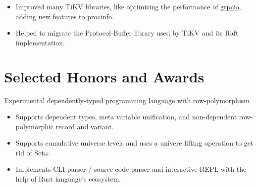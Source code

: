 \documentclass{resume}
\begin{document}
\begin{itemize}
  \item Improved many TiKV libraries, like
    optimizing the performance of
    \href{https://docs.rs/crate/grpcio} {grpcio},
    adding new features to
    \href{https://docs.rs/crate/procinfo} {procinfo}.
  \item Helped to migrate the Protocol-Buffer library used by TiKV and its Raft implementation.
\end{itemize}

\section{Selected Honors and Awards}


Experimental dependently-typed programming language with row-polymorphism
\begin{itemize}
  \item Supports dependent types, meta variable unification, and non-dependent row-polymorphic record and variant.
  \item Supports cumulative universe levels and uses a univere lifting operation to get rid of Set$\omega$.
  \item Implements CLI parser / source code parser and interactive REPL with the help of Rust language's ecosystem.
\end{itemize}
\end{document}
